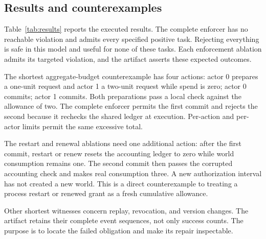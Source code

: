 \documentclass[10pt,twocolumn,letterpaper]{article}
\begin{document}
\subsection{Results and counterexamples}
Table~\ref{tab:results} reports the executed results. The complete enforcer has no reachable violation and admits every specified positive task. Rejecting everything is safe in this model and useful for none of these tasks. Each enforcement ablation admits its targeted violation, and the artifact asserts these expected outcomes.

The shortest aggregate-budget counterexample has four actions: actor 0 prepares a one-unit request and actor 1 a two-unit request while spend is zero; actor 0 commits; actor 1 commits. Both preparations pass a local check against the allowance of two. The complete enforcer permits the first commit and rejects the second because it rechecks the shared ledger at execution. Per-action and per-actor limits permit the same excessive total.

The restart and renewal ablations need one additional action: after the first commit, restart or renew resets the accounting ledger to zero while world consumption remains one. The second commit then passes the corrupted accounting check and makes real consumption three. A new authorization interval has not created a new world. This is a direct counterexample to treating a process restart or renewed grant as a fresh cumulative allowance.

Other shortest witnesses concern replay, revocation, and version changes. The artifact retains their complete event sequences, not only success counts. The purpose is to locate the failed obligation and make its repair inspectable.
\end{document}
